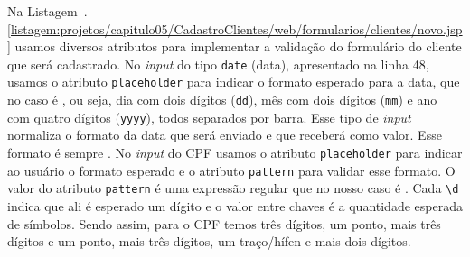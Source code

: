  
 


Na Listagem~\thechapter.\ref{listagem:projetos/capitulo05/CadastroClientes/web/formularios/clientes/novo.jsp} usamos diversos atributos para implementar a validação do formulário do cliente que será cadastrado. No \textit{input} do tipo \texttt{date} (data), apresentado na linha 48, usamos o atributo \texttt{placeholder} para indicar o formato esperado para a data, que no caso é , ou seja, dia com dois dígitos (\texttt{dd}), mês com dois dígitos (\texttt{mm}) e ano com quatro dígitos (\texttt{yyyy}), todos separados por barra. Esse tipo de \textit{input} normaliza o formato da data que será enviado e que receberá como valor. Esse formato é sempre . No \textit{input} do CPF usamos o atributo \texttt{placeholder} para indicar ao usuário o formato esperado e o atributo \texttt{pattern} para validar esse formato. O valor do atributo \texttt{pattern} é uma expressão regular que no nosso caso é . Cada \texttt{\textbackslash d} indica que ali é esperado um dígito e o valor entre chaves é a quantidade esperada de símbolos. Sendo assim, para o CPF temos três dígitos, um ponto, mais três dígitos e um ponto, mais três dígitos, um traço/hífen e mais dois dígitos.


